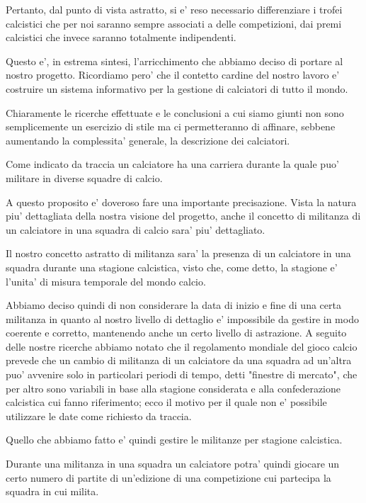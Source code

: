 Pertanto, dal punto di vista astratto, si e' reso necessario differenziare i trofei calcistici
che per noi saranno sempre associati a delle competizioni, dai premi calcistici che invece
saranno totalmente indipendenti.

\bigskip
\bigskip

Questo e', in estrema sintesi, l'arricchimento che abbiamo deciso di portare al nostro progetto.
Ricordiamo pero' che il contetto cardine del nostro lavoro e' costruire un sistema informativo
per la gestione di calciatori di tutto il mondo.

Chiaramente le ricerche effettuate e le conclusioni a cui siamo giunti non sono semplicemente
un esercizio di stile ma ci permetteranno di affinare, sebbene aumentando la complessita'
generale, la descrizione dei calciatori.

\bigskip
\bigskip

Come indicato da traccia un calciatore ha una carriera durante la quale puo' militare in diverse
squadre di calcio.

A questo proposito e' doveroso fare una importante precisazione. Vista la natura piu' dettagliata
della nostra visione del progetto, anche il concetto di militanza di un calciatore in una squadra
di calcio sara' piu' dettagliato.

Il nostro concetto astratto di militanza sara' la presenza di un calciatore in una squadra
durante una stagione calcistica, visto che, come detto, la stagione e' l'unita' di misura
temporale del mondo calcio.

Abbiamo deciso quindi di non considerare la data di inizio e fine di una certa militanza in
quanto al nostro livello di dettaglio e' impossibile da gestire in modo coerente e corretto,
mantenendo anche un certo livello di astrazione.
A seguito delle nostre ricerche abbiamo notato che il regolamento mondiale del gioco calcio
prevede che un cambio di militanza di un calciatore da una squadra ad un'altra puo' avvenire
solo in particolari periodi di tempo, detti "finestre di mercato", che per altro sono variabili
in base alla stagione considerata e alla confederazione calcistica cui fanno riferimento;
ecco il motivo per il quale non e' possibile utilizzare le date come richiesto da traccia.

Quello che abbiamo fatto e' quindi gestire le militanze per stagione calcistica.

Durante una militanza in una squadra un calciatore potra' quindi giocare un certo numero di
partite di un'edizione di una competizione cui partecipa la squadra in cui milita.

